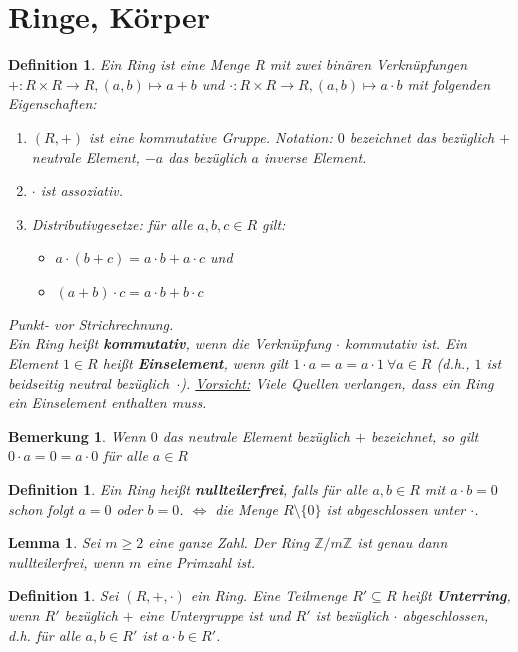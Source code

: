\documentclass[12pt,a4paper]{article}
\theoremstyle{plain}
\newtheorem{Lemma}[Theorem]{Lemma}
\newtheorem{Definition}[Theorem]{Definition}
\newtheorem{Bemerkung}[Theorem]{Bemerkung}
\newcommand{\herv}[1]{{\emph{\textbf{#1}}}}
\newcommand{\Z}{\mathbb{Z}}
\numberwithin{equation}{section}
\begin{document}
\section{Ringe, Körper}
\begin{Definition}
Ein Ring ist eine Menge R mit zwei binären Verknüpfungen $+:R\times R\rightarrow R, (a,b)\mapsto a+b$ und $\cdot :R\times R\rightarrow R, (a,b)\mapsto a\cdot b$ mit folgenden Eigenschaften:
\begin{enumerate}
\renewcommand{\labelenumi}{\emph{(R\arabic{enumi})}}
\item $(R,+)$ ist eine kommutative Gruppe. Notation: $0$ bezeichnet das bezüglich $+$ neutrale Element, $-a$ das bezüglich $a$ inverse Element.
\item $\cdot$ ist assoziativ.
\item Distributivgesetze: für alle $a,b,c\in R$ gilt:
\begin{itemize}
\item $a\cdot(b+c)=a\cdot b+ a\cdot c$ und
\item $(a+b)\cdot c= a\cdot b + b\cdot c$
\end{itemize}
\end{enumerate}
\glqq Punkt- vor Strichrechnung\grqq. \\
Ein Ring heißt \herv{kommutativ}, wenn die Verknüpfung $\cdot$ kommutativ ist. Ein Element $1\in R$ heißt \herv{Einselement}, wenn gilt $1\cdot a=a=a\cdot 1\ \forall a\in R$ (d.h., $1$ ist beidseitig neutral \mbox{bezüglich $\cdot$).} \underline{Vorsicht:} Viele Quellen verlangen, dass ein Ring ein Einselement enthalten muss. 
\end{Definition}
\begin{Bemerkung}
Wenn $0$ das neutrale Element bezüglich $+$ bezeichnet, so gilt $0\cdot a=0=a\cdot 0$ für alle $a\in R$
\end{Bemerkung}
\begin{Definition}
Ein Ring heißt \herv{nullteilerfrei}, falls für alle $a,b\in R$ mit $a\cdot b=0$ schon folgt $a=0$ oder $b=0$. $\Leftrightarrow$ die Menge $R\setminus\{0\}$ ist abgeschlossen unter $\cdot$.
\end{Definition}
\begin{Lemma}
Sei $m\geq 2$ eine ganze Zahl. Der Ring $\Z/m\Z$ ist genau dann nullteilerfrei, wenn $m$ eine Primzahl ist.
\end{Lemma}
\begin{Definition}
Sei $(R,+,\cdot)$ ein Ring. Eine Teilmenge $R'\subseteq R$ heißt \herv{Unterring}, wenn $R'$ bezüglich $+$ eine Untergruppe ist und $R'$ ist bezüglich $\cdot$ abgeschlossen, d.h. für alle $a,b\in R'$ ist $a\cdot b\in R'$.
\end{Definition}
\end{document}
